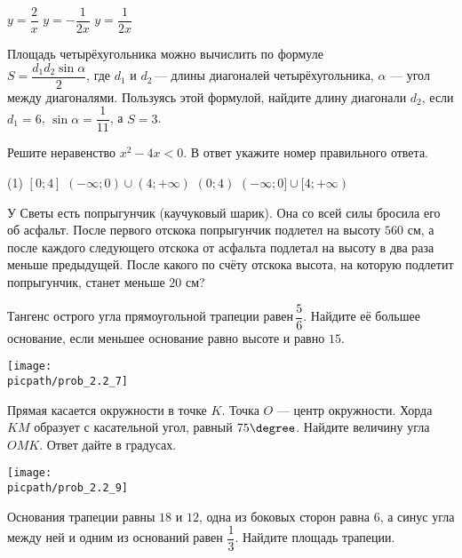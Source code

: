 \begin{training}[2]
\begin{listofex}
\begin{tasks}
			\task \( y=\dfrac{2}{x} \)
			\task \( y=-\dfrac{1}{2x} \)
			\task \( y=\dfrac{1}{2x} \)
		\end{tasks}
		\foranswer
		\item Площадь четырёхугольника можно вычислить по формуле \\ \( S=\dfrac{d_1d_2\sin\alpha}{2} \),  где \( d_1 \) и \( d_2 \) --- длины диагоналей четырёхугольника, \( \alpha \) --- угол между диагоналями. Пользуясь этой формулой, найдите длину диагонали \( d_2 \), если \( d_1=6 \), \( \sin\alpha=\dfrac{1}{11} \), а \( S=3 \).
		\foranswer
		\item Решите неравенство \( x^2-4x<0 \). В ответ укажите номер правильного ответа.
		\begin{tasks}(1)
			\task \( [0;4] \)
			\task \( (-\infty;0)\cup(4;+\infty) \)
			\task \( (0;4) \)
			\task \( (-\infty;0]\cup[4;+\infty) \)
		\end{tasks}
		\foranswer
		\item У Светы есть попрыгунчик (каучуковый шарик). Она со всей силы бросила его об асфальт. После первого отскока попрыгунчик подлетел на высоту \( 560 \) см, а после каждого следующего отскока от асфальта подлетал на высоту в два раза меньше предыдущей. После какого по счёту отскока высота, на которую подлетит попрыгунчик, станет меньше \( 20 \) см?
		\foranswer
		\item
		\begin{minipage}[t]{\bodywidth}
			Тангенс острого угла прямоугольной трапеции равен \( \dfrac{5}{6} \).  Найдите её большее основание, если меньшее основание равно высоте и равно \( 15 \).
			\foranswer
		\end{minipage}
		\gapwidth
		\begin{minipage}[t]{\picwidth}
			\texttt{[image: \\picpath/prob\_2.2\_7]}
		\end{minipage}
		\item 
		\begin{minipage}[t]{\bodywidth}
			Прямая касается окружности в точке \( K \). Точка \( O \) --- центр окружности. Хорда \( KM \) образует с касательной угол, равный \( 75\degree \). Найдите величину угла \( OMK \). Ответ дайте в градусах.
			\foranswer
		\end{minipage}
		\gapwidth
		\begin{minipage}[t]{\picwidth}
			\texttt{[image: \\picpath/prob\_2.2\_9]}
		\end{minipage}
		\item Основания трапеции равны \( 18 \) и \( 12 \), одна из боковых сторон равна \( 6 \), а синус угла между ней и одним из оснований равен \( \dfrac{1}{3} \).  Найдите площадь трапеции.

\end{listofex}
\end{training}
